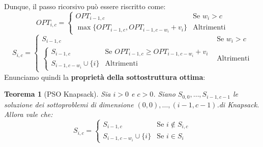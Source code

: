 \documentclass[12pt]{article}
\newtheorem{Teorema}{Teorema}[subsection]
\begin{document}
Dunque, il passo ricorsivo può essere riscritto come:
\begin{equation*}
    OPT_{i,c} = \begin{cases}
        OPT_{i-1, c} & \textrm{Se } w_i > c \\
        \max\{OPT_{i-1, c}, OPT_{i-1, c-w_i} + v_i\} & \textrm{Altrimenti}
    \end{cases}
\end{equation*}
\begin{equation*}
    S_{i,c} = \begin{cases}
        S_{i-1, c} & \textrm{Se } w_i > c \\
        \begin{cases}
            S_{i-1, c} & \textrm{Se } OPT_{i-1, c} \geq OPT_{i-1, c-w_i} + v_i \\
            S_{i-1, c-w_i} \cup \{i\} & \textrm{Altrimenti}
        \end{cases} & \textrm{Altrimenti}
    \end{cases}
\end{equation*}
Enunciamo quindi la \textbf{proprietà della sottostruttura ottima}:
\begin{Teorema}[PSO Knapsack]
    Sia $i > 0$ e $c > 0$. Siano $S_{0, 0}, \dots, S_{i-1, c-1}$ le soluzione dei sottoproblemi di dimensione
    $(0, 0), \dots, (i-1, c-1)$.di Knapsack. Allora vale che:
    \begin{equation*}
        S_{i,c} = \begin{cases}
            S_{i-1,c} & \textrm{Se } i \notin S_{i,c} \\
            S_{i-1, c-w_i} \cup \{i\} & \textrm{Se } i \in S_i
        \end{cases}
    \end{equation*}
\end{Teorema}
\end{document}
